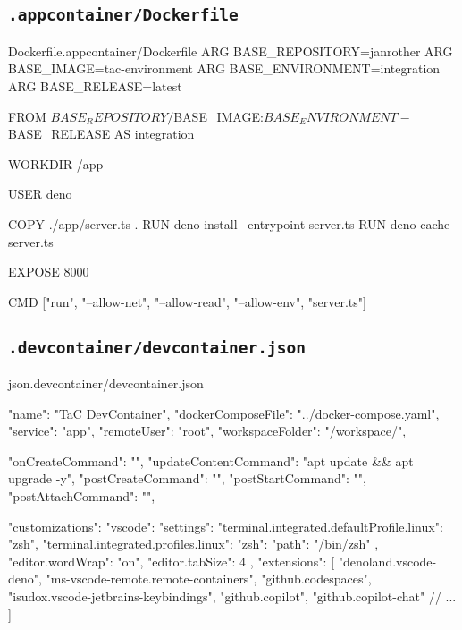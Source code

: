 \subsection{\texttt{.appcontainer/Dockerfile}}
\label{subsec:BB-01-03_appcontainer-X-dockerfile}

\begin{codebox}{Dockerfile}{.appcontainer/Dockerfile}
ARG BASE_REPOSITORY=janrother
ARG BASE_IMAGE=tac-environment
ARG BASE_ENVIRONMENT=integration
ARG BASE_RELEASE=latest

FROM ${BASE_REPOSITORY}/${BASE_IMAGE}:${BASE_ENVIRONMENT}-${BASE_RELEASE} AS integration

WORKDIR /app

USER deno

COPY ./app/server.ts .
RUN deno install --entrypoint server.ts
RUN deno cache server.ts

EXPOSE 8000

CMD ["run", "--allow-net", "--allow-read", "--allow-env", "server.ts"]
\end{codebox}

\subsection{\texttt{.devcontainer/devcontainer.json}}
\label{subsec:BB-01-04_devcontainer-X-devcontainer-json}

\begin{codebox}{json}{.devcontainer/devcontainer.json}
{
    "name": "TaC DevContainer",
    "dockerComposeFile": "../docker-compose.yaml",
    "service": "app",
    "remoteUser": "root",
    "workspaceFolder": "/workspace/",

    "onCreateCommand": "",
    "updateContentCommand": "apt update && apt upgrade -y",
    "postCreateCommand": "",
    "postStartCommand": "",
    "postAttachCommand": "",
  
    "customizations": {
    "vscode": {
        "settings": {
            "terminal.integrated.defaultProfile.linux": "zsh",
            "terminal.integrated.profiles.linux": {
                "zsh": {
                "path": "/bin/zsh"
                }
            },
            "editor.wordWrap": "on",
            "editor.tabSize": 4
        },
        "extensions": [
            "denoland.vscode-deno",
            "ms-vscode-remote.remote-containers",
            "github.codespaces",
            "isudox.vscode-jetbrains-keybindings",
            "github.copilot",
            "github.copilot-chat"
            // ...
        ]
    }
  }
}
\end{codebox}

